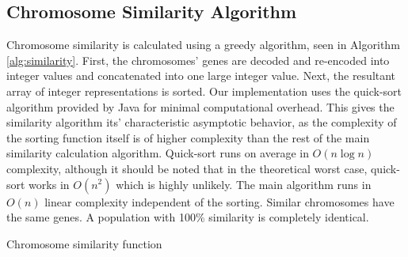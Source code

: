 \documentclass[conference]{IEEEtran}
\begin{document}
\subsection{Chromosome Similarity Algorithm}
Chromosome similarity is calculated using a greedy algorithm, seen in Algorithm \ref{alg:similarity}. First, the chromosomes' genes are decoded and re-encoded into integer values and concatenated into one large integer value. Next, the resultant array of integer representations is sorted. Our implementation uses the quick-sort algorithm provided by Java for minimal computational overhead. This gives the similarity algorithm its' characteristic asymptotic behavior, as the complexity of the sorting function itself is of higher complexity than the rest of the main similarity calculation algorithm. Quick-sort runs on average in $O(n \log n)$ complexity, although it should be noted that in the theoretical worst case, quick-sort works in $O(n^2)$ which is highly unlikely. The main algorithm runs in $O(n)$ linear complexity independent of the sorting. Similar chromosomes have the same genes. A population with 100\% similarity is completely identical.

\begin{algorithm}
  \SetAlgoLined
  \DontPrintSemicolon
  
\caption{Chromosome similarity function}
\label{alg:similarity}
\end{algorithm}
\end{document}
